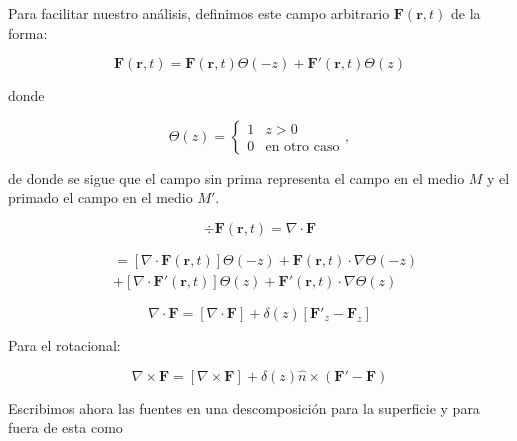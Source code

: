 Para facilitar nuestro análisis, definimos este campo arbitrario $\mathbf{F}(\mathbf r,t)$ de la forma:

\begin{equation}
    \mathbf{F}(\mathbf r,t) = \mathbf{F}(\mathbf r,t)\Theta(-z) + \mathbf{F}'(\mathbf r,t)\Theta(z)
    \label{eq:field_piecewise}
\end{equation}

donde

\begin{equation}
    \Theta(z) =
    \begin{cases}
        1 & z>0 \\
        0 & \text{en otro caso}
    \end{cases},
\end{equation}

de donde se sigue que el campo sin prima representa el campo en el medio $M$ y el primado el campo en el medio $M'$. 


\begin{equation} 
    \div \mathbf{F}(\mathbf r,t) = \nabla \cdot \mathbf{F}
\end{equation}

\begin{equation}
    \begin{split}
        &= [\nabla \cdot \mathbf{F}(\mathbf r,t)] \Theta(-z) + \mathbf{F}(\mathbf r,t) \cdot \nabla \Theta(-z) \\
        &+ [\nabla \cdot \mathbf{F}'(\mathbf r,t)] \Theta(z) + \mathbf{F}'(\mathbf r,t) \cdot \nabla \Theta(z)
    \end{split}
\end{equation}

\begin{equation}
    \nabla \cdot \mathbf{F} = [\nabla \cdot \mathbf{F}] + \delta(z) [\mathbf{F}'_z - \mathbf{F}_z]
    \label{eq:div_field}
\end{equation}

\pagebreak

Para el rotacional:

\begin{equation}
    \nabla \times \mathbf{F} = [\nabla \times \mathbf{F}] + \delta(z) \hat{n} \times (\mathbf{F}' - \mathbf{F})
    \label{eq:curl_field}
\end{equation}

Escribimos ahora las fuentes en una descomposición para la superficie
y para fuera de esta como

